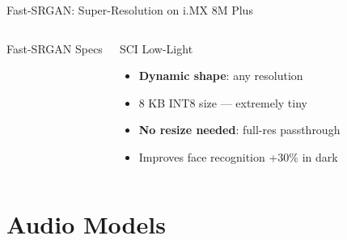 \documentclass[aspectratio=169]{beamer}
\begin{document}
\begin{frame}{Fast-SRGAN: Super-Resolution on i.MX 8M Plus}
\begin{columns}
\begin{block}{Fast-SRGAN Specs}
\begin{itemize}
\end{itemize}
\end{block}
\begin{block}{SCI Low-Light}
\begin{itemize}
  \item \textbf{Dynamic shape}: any resolution
  \item 8 KB INT8 size --- extremely tiny
  \item \textbf{No resize needed}: full-res passthrough
  \item Improves face recognition +30\% in dark
\end{itemize}
\end{block}
\end{columns}
\end{frame}

\section{Audio Models}
\end{document}
